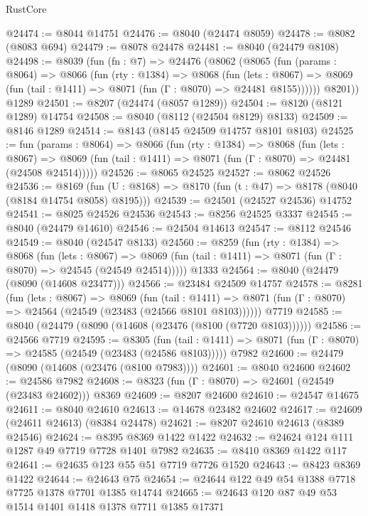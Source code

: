 \begin{lexlean}{RustCore}
\begin{coremodule}
@24474 := @8044 @14751
@24476 := @8040 (@24474 @8059)
@24478 := @8082 (@8083 @694)
@24479 := @8078 @24478
@24481 := @8040 (@24479 @8108)
@24498 := @8039
    (fun (fn : @7) =>
    @24476
      (@8062
        (@8065
          (fun (params : @8064) =>
          @8066
            (fun (rty : @1384) =>
            @8068
              (fun (lets : @8067) =>
              @8069 (fun (tail : @1411) => @8071 (fun (Γ : @8070) => @24481 @8155))))))
        @8201))
    @1289
@24501 := @8207 (@24474 (@8057 @1289))
@24504 := @8120 (@8121 @1289) @14754
@24508 := @8040 (@8112 (@24504 @8129) @8133)
@24509 := @8146 @1289
@24514 := @8143 (@8145 @24509 @14757 @8101 @8103)
@24525 := fun (params : @8064) =>
  @8066
    (fun (rty : @1384) =>
    @8068
      (fun (lets : @8067) =>
      @8069 (fun (tail : @1411) => @8071 (fun (Γ : @8070) => @24481 (@24508 @24514)))))
@24526 := @8065 @24525
@24527 := @8062 @24526
@24536 := @8169
    (fun (U : @8168) => @8170 (fun (t : @47) => @8178 (@8040 (@8184 @14754 @8058) @8195)))
@24539 := @24501 (@24527 @24536) @14752
@24541 := @8025 @24526 @24536
@24543 := @8256 @24525 @3337
@24545 := @8040 (@24479 @14610)
@24546 := @24504 @14613
@24547 := @8112 @24546
@24549 := @8040 (@24547 @8133)
@24560 := @8259
    (fun (rty : @1384) =>
    @8068
      (fun (lets : @8067) =>
      @8069 (fun (tail : @1411) => @8071 (fun (Γ : @8070) => @24545 (@24549 @24514)))))
    @1333
@24564 := @8040 (@24479 (@8090 (@14608 @23477)))
@24566 := @23484 @24509 @14757
@24578 := @8281
    (fun (lets : @8067) =>
    @8069
      (fun (tail : @1411) =>
      @8071 (fun (Γ : @8070) => @24564 (@24549 (@23483 (@24566 @8101 @8103))))))
    @7719
@24585 := @8040 (@24479 (@8090 (@14608 (@23476 (@8100 (@7720 @8103))))))
@24586 := @24566 @7719
@24595 := @8305
    (fun (tail : @1411) => @8071 (fun (Γ : @8070) => @24585 (@24549 (@23483 (@24586 @8103)))))
    @7982
@24600 := @24479 (@8090 (@14608 (@23476 (@8100 @7983))))
@24601 := @8040 @24600
@24602 := @24586 @7982
@24608 := @8323 (fun (Γ : @8070) => @24601 (@24549 (@23483 @24602))) @8369
@24609 := @8207 @24600
@24610 := @24547 @14675
@24611 := @8040 @24610
@24613 := @14678 @23482 @24602
@24617 := @24609 (@24611 @24613) (@8384 @24478)
@24621 := @8207 @24610 @24613 (@8389 @24546)
@24624 := @8395 @8369 @1422 @1422
@24632 := @24624 @124 @111 @1287 @49 @7719 @7728 @1401 @7982
@24635 := @8410 @8369 @1422 @117
@24641 := @24635 @123 @55 @51 @7719 @7726 @1520
@24643 := @8423 @8369 @1422
@24644 := @24643 @75
@24654 := @24644 @122 @49 @54 @1388 @7718 @7725 @1378 @7701 @1385 @14744
@24665 := @24643 @120 @87 @49 @53 @1514 @1401 @1418 @1378 @7711 @1385 @17371

\end{coremodule}
\end{lexlean}
